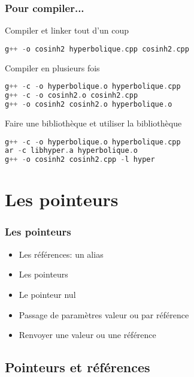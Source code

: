 \documentclass{beamer}
\begin{document}
\begin{frame}[fragile=singleslide,shrink=20]
\frametitle{Pour compiler...}

\begin{block}{Compiler et linker tout d'un coup}
\begin{lstlisting}[language=c++]
g++ -o cosinh2 hyperbolique.cpp cosinh2.cpp
\end{lstlisting}
\end{block}

\begin{block}{Compiler en plusieurs fois}
\begin{lstlisting}[language=c++]
g++ -c -o hyperbolique.o hyperbolique.cpp
g++ -c -o cosinh2.o cosinh2.cpp
g++ -o cosinh2 cosinh2.o hyperbolique.o
\end{lstlisting}
\end{block}

\begin{block}{Faire une bibliothèque et utiliser la bibliothèque}
\begin{lstlisting}[language=c++]
g++ -c -o hyperbolique.o hyperbolique.cpp
ar -c libhyper.a hyperbolique.o
g++ -o cosinh2 cosinh2.cpp -l hyper
\end{lstlisting}
\end{block}

\end{frame}

\section{Les pointeurs}


\begin{frame}[fragile=singleslide,shrink=20]
\frametitle{Les pointeurs}

\begin{itemize}
\item{Les références: un alias}
\item{Les pointeurs}
\item{Le pointeur nul}
\item{Passage de paramètres valeur ou par référence}
\item{Renvoyer une valeur ou une référence}

\end{itemize}
\end{frame}

\subsection{Pointeurs et références}
\end{document}
